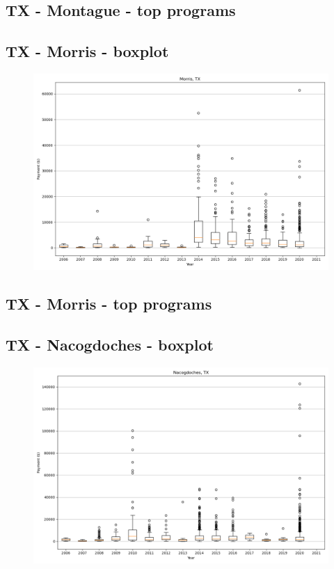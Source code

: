 \subsection*{TX - Montague - top programs}

\newpage
\subsection*{TX - Morris - boxplot}
\begin{figure}[h]
\centering
\includegraphics[width=7in]{../output/boxplots/counties/Morris-TX_boxplot.png}
\end{figure}


\subsection*{TX - Morris - top programs}

\newpage
\subsection*{TX - Nacogdoches - boxplot}
\begin{figure}[h]
\centering
\includegraphics[width=7in]{../output/boxplots/counties/Nacogdoches-TX_boxplot.png}
\end{figure}


